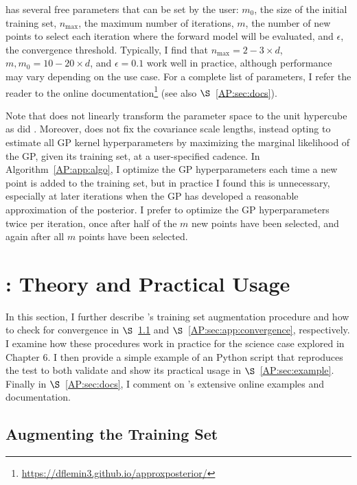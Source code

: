 \approxposterior has several free parameters that can be set by the user: $m_0$, the size of the initial training set, $n_{\mathrm{max}}$, the maximum number of iterations, $m$, the number of new points to select each iteration where the forward model will be evaluated, and $\epsilon$, the convergence threshold. Typically, I find that $n_{\mathrm{max}}=2-3 \times d$, $m, m_0 = 10-20 \times d$, and $\epsilon = 0.1$ work well in practice, although performance may vary depending on the use case. For a complete list of \approxposterior parameters, I refer the reader to the online documentation\footnote{ \href{https://dflemin3.github.io/approxposterior}{https://dflemin3.github.io/approxposterior/}} (see also $\S$~\ref{AP:sec:docs}).

Note that \approxposterior does not linearly transform the parameter space to the unit hypercube as did \citet{Kandasamy2017}. Moreover, \approxposterior does not fix the covariance scale lengths, instead opting to estimate all GP kernel hyperparameters by maximizing the marginal likelihood of the GP, given its training set, at a user-specified cadence. In Algorithm~\ref{AP:app:algo}, I optimize the GP hyperparameters each time a new point is added to the training set, but in practice I found this is unnecessary, especially at later iterations when the GP has developed a reasonable approximation of the posterior. I prefer to optimize the GP hyperparameters twice per iteration, once after half of the $m$ new points have been selected, and again after all $m$ points have been selected.

\section{\approxposterior: Theory and Practical Usage} \label{ap:sec:usage}

In this section, I further describe \approxposterior's training set augmentation procedure and how to check for convergence in $\S$~\ref{AP:sec:augment} and $\S$~\ref{AP:sec:app:convergence}, respectively. I examine how these procedures work in practice for the science case explored in Chapter 6.  I then provide a simple example of an \approxposterior Python script that reproduces the \citet{Wang2018} test to both validate \approxposterior and show its practical usage in $\S$~\ref{AP:sec:example}. Finally in $\S$~\ref{AP:sec:docs}, I comment on \approxposterior's extensive online examples and documentation.

\subsection{Augmenting the Training Set} \label{AP:sec:augment}

